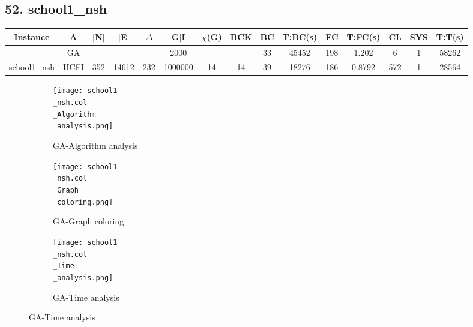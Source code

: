 \documentclass[10pt]{article}
\begin{document}
\subsection*{\hspace{0,9073976cm} 52. school1\_nsh}
\begin{table}[H]
\centering
\begin{tabular}{|c|c|c|c|c|c|c|c|c|c|c|c|c|c|c|}
\hline
Instance& A &$|$N$|$ & $|$E$|$ & $\Delta$ & G$|$I & $\chi$(G) &BCK&BC & T:BC(s) & FC & T:FC(s) & CL & SYS & T:T(s) \\ \hline \hline

	&GA&       &                   &                     &  2000       &     \cellcolor{yellow} & {\cellcolor{yellow}}& {{\cellcolor{green}33}}
&45452   & 198       &  1.202                  & 6                   & 1         &58262        \\ \cline{2-2} \cline{6-6} \cline{9-15}
 \multirow{-2}{*}{school1\_nsh} &HCFI   &\multirow{-2}{*}{352}   &\multirow{-2}{*}{14612}     &\multirow{-2}{*}{232}     &1000000     &\multirow{-2}{*}{\cellcolor{yellow}14}      & \multirow{-2}{*}{\cellcolor{yellow}14}    &{\cellcolor{green}39}     &18276         &186    &0.8792         &572    &1     &28564        \\ \hline
\end{tabular}
\end{table}
\graphicspath{{./Core1/Solutions/GA/school1\_nsh.col}}
\begin{figure}[H]
\begin{subfigure}{.33\textwidth}
  \centering
  \texttt{[image: school1\\\_nsh.col\\\_Algorithm\\\_analysis.png]}
  \caption{GA-Algorithm analysis}
   \label{fig:subfig1}
\end{subfigure}%
\begin{subfigure}{.33\textwidth}
  \centering
  \texttt{[image: school1\\\_nsh.col\\\_Graph\\\_coloring.png]}
  \caption{GA-Graph coloring}
  \label{fig:subfig2}
\end{subfigure}
\begin{subfigure}{.33\textwidth}
  \centering
  \texttt{[image: school1\\\_nsh.col\\\_Time\\\_analysis.png]}
  \caption{GA-Time analysis}
  \end{subfigure}
\end{figure}
\end{document}
